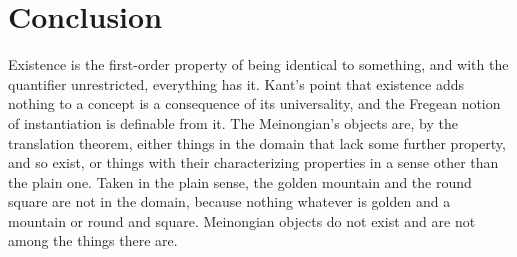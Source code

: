 \documentclass{situationist-preprint}
\begin{document}
\section{Conclusion}

Existence is the first-order property of being identical to something, and with the quantifier unrestricted, everything has it. Kant's point that existence adds nothing to a concept is a consequence of its universality, and the Fregean notion of instantiation is definable from it. The Meinongian's objects are, by the translation theorem, either things in the domain that lack some further property, and so exist, or things with their characterizing properties in a sense other than the plain one. Taken in the plain sense, the golden mountain and the round square are not in the domain, because nothing whatever is golden and a mountain or round and square. Meinongian objects do not exist and are not among the things there are.
\end{document}

